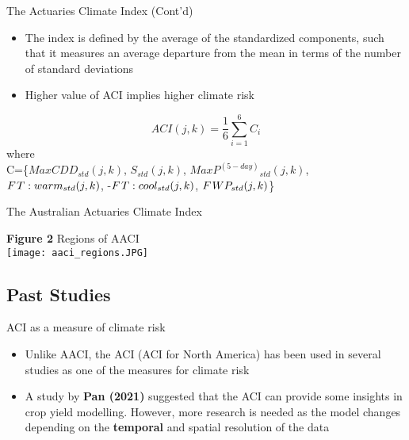 \documentclass[aspectratio=169]{beamer}
\begin{document}
\begin{frame}{The Actuaries Climate Index (Cont'd)}
    \begin{itemize}
        \item The index is defined by the average of the standardized components, such that it measures an average departure from the mean in terms of the number of standard deviations
        \item Higher value of ACI implies higher climate risk
    \end{itemize}
    \begin{equation}
       ACI(j,k)=\frac{1}{6}\sum^{6}_{i=1}C_{i}
    \end{equation}
    \scriptsize{where}\\
    \vspace{10pt}
    \scriptsize{C=\{$MaxCDD_{std}(j,k)$, $S_{std}(j,k)$, ${MaxP^{(5-day)}}_{std}(j,k)$, $F\hspace{1 pt}T:warm_{std}(j,k)$, -$F\hspace{1 pt}T:cool_{std}(j,k)$, $F\hspace{1 pt}WP_{std}(j,k)$\}}
\end{frame}

\begin{frame}{The Australian Actuaries Climate Index}
    \begin{center}
        \scriptsize{\textbf{Figure 2} Regions of AACI}\\
        \texttt{[image: aaci\_regions.JPG]}
    \end{center}
\end{frame}

\subsection{Past Studies}
\begin{frame}{ACI as a measure of climate risk}
    \begin{itemize}
        \item Unlike AACI, the ACI (ACI for North America) has been used in several studies as one of the measures for climate risk
        \item A study by \textbf{Pan (2021)} suggested that the ACI can provide some insights in crop yield modelling. However, more research is needed as the model changes depending on the \textbf{temporal} and spatial resolution of the data
    \end{itemize}
\end{frame}
\end{document}
